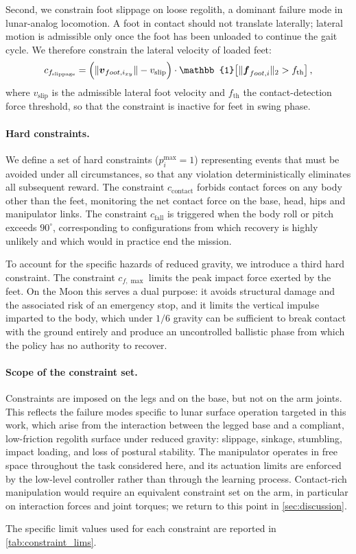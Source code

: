 Second, we constrain foot slippage on loose regolith, a dominant failure mode in lunar-analog locomotion. A foot in contact should not translate laterally; lateral motion is admissible only once the foot has been unloaded to continue the gait cycle. We therefore constrain the lateral velocity of loaded feet:
%
\begin{equation}
    c_{f_{\text{slippage}}} =
    \Bigl( \lVert \boldsymbol{v}_{foot, i_{xy}} \rVert - v_{\text{slip}} \Bigr)
    \cdot \mathbb{1}\!\left[\lVert \boldsymbol{f}_{foot,i}\rVert_2 > f_{\text{th}}\right],
    \label{eq:slippage}
\end{equation}
%
where $v_{\text{slip}}$ is the admissible lateral foot velocity and $f_{\text{th}}$ the contact-detection force threshold, so that the constraint is inactive for feet in swing phase.

\paragraph{Hard constraints.} We define a set of hard constraints ($p_i^{\max}=1$) representing events that must be avoided under all circumstances, so that any violation deterministically eliminates all subsequent reward. The constraint $c_{\text{contact}}$ forbids contact forces on any body other than the feet, monitoring the net contact force on the base, head, hips and manipulator links. The constraint $c_{\text{fall}}$ is triggered when the body roll or pitch exceeds $90^\circ$, corresponding to configurations from which recovery is highly unlikely and which would in practice end the mission.

To account for the specific hazards of reduced gravity, we introduce a third hard constraint. The constraint $c_{f,\max}$ limits the peak impact force exerted by the feet. On the Moon this serves a dual purpose: it avoids structural damage and the associated risk of an emergency stop, and it limits the vertical impulse imparted to the body, which under $1/6$ gravity can be sufficient to break contact with the ground entirely and produce an uncontrolled ballistic phase from which the policy has no authority to recover.

\paragraph{Scope of the constraint set.} Constraints are imposed on the legs and on the base, but not on the arm joints. This reflects the failure modes specific to lunar surface operation targeted in this work, which arise from the interaction between the legged base and a compliant, low-friction regolith surface under reduced gravity: slippage, sinkage, stumbling, impact loading, and loss of postural stability. The manipulator operates in free space throughout the task considered here, and its actuation limits are enforced by the low-level controller rather than through the learning process. Contact-rich manipulation would require an equivalent constraint set on the arm, in particular on interaction forces and joint torques; we return to this point in \cref{sec:discussion}.

The specific limit values used for each constraint are reported in \cref{tab:constraint_lims}.